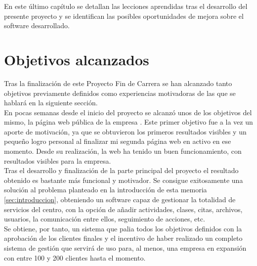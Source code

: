 

En este último capí­tulo se detallan las lecciones aprendidas tras el desarrollo del presente proyecto y se identifican las posibles oportunidades de mejora sobre el software desarrollado.

\section{Objetivos alcanzados}

Tras la finalización de este Proyecto Fin de Carrera se han alcanzado tanto objetivos previamente definidos como experiencias motivadoras de las que se hablará en la siguiente sección. \\ 

En pocas semanas desde el inicio del proyecto se alcanzó unos de los objetivos del mismo, la página web pública de la empresa \cite{CoreSport}. Este primer objetivo fue a la vez un aporte de motivación, ya que se obtuvieron los primeros resultados visibles y un pequeño logro personal al finalizar mi segunda página web en activo en ese momento. Desde su realización, la web ha tenido un buen funcionamiento, con resultados visibles para la empresa. \\

Tras el desarrollo y finalización de la parte principal del proyecto el resultado obtenido es bastante más funcional y motivador. Se consigue exitosamente una solución al problema planteado en la introducción de esta memoria \ref{sec:introduccion}, obteniendo un software capaz de gestionar la totalidad de servicios del centro, con la opción de añadir actividades, clases, citas, archivos, usuarios, la comunicación entre ellos, seguimiento de acciones, etc. \\

Se obtiene, por tanto, un sistema que palia todos los objetivos definidos con la aprobación de los clientes finales y el incentivo de haber realizado un completo sistema de gestión que servirá de uso para, al menos, una empresa en expansión con entre 100 y 200 clientes hasta el momento.


